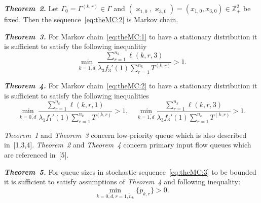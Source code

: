 \textit{\textbf{Theorem~2.}} 
Let $\Gamma_0=\Gamma^{(k,r)}\in \Gamma$ and $(\varkappa_{1,0}, \varkappa_{3,0})=(x_{1,0}, x_{3,0})\in \mathbb{Z}_+^2$ be fixed. Then the sequence~\eqref{eq:theMC:2} is Markov chain.


\textit{\textbf{Theorem~3.}} 
For Markov chain~\eqref{eq:theMC:1} to have a stationary distribution it is sufficient to satisfy the following inequalitiy
\begin{equation*}
\min_{k=\overline{1,d}} { \frac{\sum_{r = 1}^{n_k} \ell(k,r,3) }{\lambda_3 f_3'(1) \sum_{r=1}^{n_k} T^{(k,r)} }}>1.
\label{sufficient:double}
\end{equation*}


\textit{\textbf{Theorem~4.}} 
For Markov chain~\eqref{eq:theMC:2} to have a stationary distribution it is sufficient to satisfy the following inequalities
\begin{equation*}
\min_{k=\overline{0,d}} { \frac{\sum_{r = 1}^{n_k} \ell(k,r,1) }{\lambda_1 f_1'(1) \sum_{r=1}^{n_k} T^{(k,r)} }}>1, \quad 
\min_{k=\overline{1,d}} { \frac{\sum_{r = 1}^{n_k} \ell(k,r,3) }{\lambda_3 f_3'(1) \sum_{r=1}^{n_k} T^{(k,r)} }}>1.
\label{sufficient:double}
\end{equation*}


\textit{Theorem~1} and \textit{Theorem~3} concern low-priority queue which is also described in~[1,3,4]. \textit{Theorem~2} and \textit{Theorem~4} concern primary input flow queues which are referenced in~[5].

\textit{\textbf{Theorem~5.}} 
For queue sizes in stochastic sequence~\eqref{eq:theMC:3} to be bounded it is sufficient to satisfy assumptions of \textit{Theorem~4} and following inequality:
\begin{equation*}
    \min_{k=\overline{0,d}, r=\overline{1,n_k}} {\{p_{k,r}\}} > 0.
\end{equation*}

